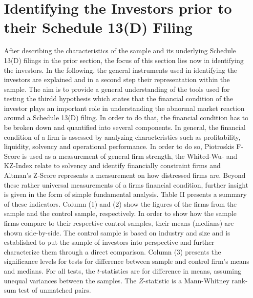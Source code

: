 \documentclass[12pt]{article}
\begin{document}
\section{Identifying the Investors prior to their Schedule 13(D) Filing}


After describing the characteristics of the sample and its underlying Schedule 13(D) filings in the prior section, the focus of this section lies now in identifying the investors. In the following, the general instruments used in identifying the investors are explained and in a second step their representation within the sample. The aim is to provide a general understanding of the tools used for testing the thirdd hypothesis which states that the financial condition of the investor plays an important role in understanding the abnormal market reaction around a Schedule 13(D) filing. In order to do that, the financial condition has to be broken down and quantified into several components. 
In general, the financial condition of a firm is assessed by analyzing  characteristics such as profitability, liquidity, solvency and operational performance. In order to do so, Piotroskis F-Score is used as a measurement of general firm strength, the Whited-Wu- and KZ-Index relate to solvency and identify financially constraint firms and Altman's Z-Score represents a measurement on how distressed firms are. Beyond these rather universal measurements of a firms financial condition, further insight is given in the form of simple fundamental analysis.
Table II presents a summary of these indicators. Column (1) and (2) show the figures of the firms from the sample and the control sample, respectively. In order to show how the sample firms compare to their respective control samples, their means (medians) are shown side-by-side. The control sample is based on industry and size and is established to put the sample of investors into perspective and further characterize them through a direct comparison.  Column (3) presents the significance levels for tests for difference between sample and control firm's means and medians. For all tests, the $t$-statistics are for difference in means, assuming unequal variances between the samples. The $Z$-statistic is a Mann-Whitney rank-sum test of unmatched pairs. 
\end{document}
